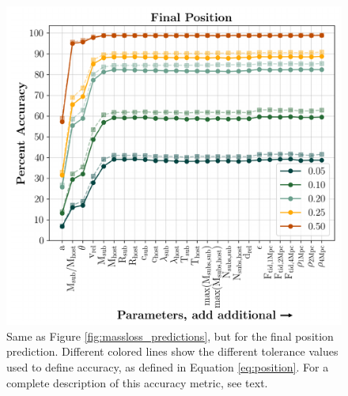 \documentclass[fleqn,usenatbib]{mnras}
\begin{document}
\begin{figure}
	\includegraphics[width=\columnwidth]{Figures/position_predictions}
	\vspace{-15pt}
    \caption{Same as Figure \ref{fig:massloss_predictions}, but for the final position prediction. Different colored lines show the different tolerance values used to define accuracy, as defined in Equation \ref{eq:position}. For a complete description of this accuracy metric, see text.}
    \label{fig:position_predictions}
\end{figure}
\end{document}

